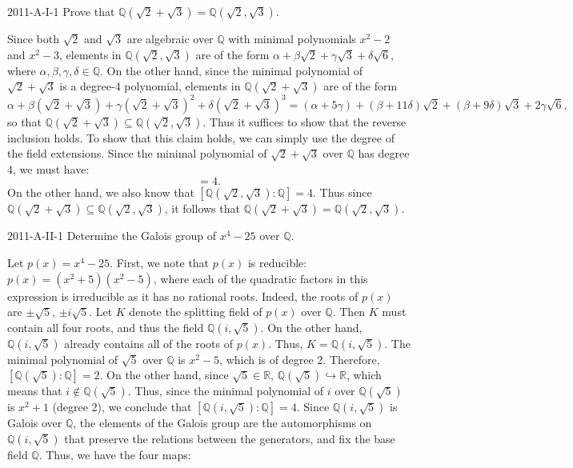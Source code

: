 \documentclass{article}
\newcommand{\embedd}{\hookrightarrow}
\begin{document}
	\begin{prb}{2011-A-I-1}
		Prove that $\mathbb{Q}(\sqrt{2} + \sqrt{3}) = \mathbb{Q}(\sqrt{2}, \sqrt{3})$. 
	\end{prb}
	Since both $\sqrt{2}$ and $\sqrt{3}$ are algebraic over $\mathbb{Q}$ with minimal polynomials $x^{2} - 2$ and $x^{2} - 3$, elements in $\mathbb{Q}(\sqrt{2}, \sqrt{3})$ are of the form $\alpha + \beta \sqrt{2} + \gamma \sqrt{3} + \delta \sqrt{6}$, where $\alpha, \beta, \gamma, \delta \in \mathbb{Q}$. On the other hand, since the minimal polynomial of $\sqrt{2} + \sqrt{3}$ is a degree-4 polynomial, elements in $\mathbb{Q}(\sqrt{2} + \sqrt{3})$ are of the form $$\alpha + \beta (\sqrt{2} + \sqrt{3}) + \gamma (\sqrt{2} + \sqrt{3})^{2} + \delta (\sqrt{2} + \sqrt{3})^{3} = (\alpha + 5\gamma) + (\beta + 11\delta)\sqrt{2} + (\beta + 9\delta)\sqrt{3} + 2\gamma\sqrt{6},$$ 
	so that $\mathbb{Q}(\sqrt{2} + \sqrt{3}) \subseteq \mathbb{Q}(\sqrt{2}, \sqrt{3})$. Thus it suffices to show that the reverse inclusion holds. To show that this claim holds, we can simply use the degree of the field extensions. Since the minimal polynomial of $\sqrt{2} + \sqrt{3}$ over $\mathbb{Q}$ has degree 4, we must have: 
	\begin{equation*}
		[\mathbb{Q}(\sqrt{2} + \sqrt{3}): \mathbb{Q}] = 4. 
	\end{equation*}
	On the other hand, we also know that $[\mathbb{Q}(\sqrt{2}, \sqrt{3}):\mathbb{Q}] = 4$. Thus since $\mathbb{Q}(\sqrt{2} + \sqrt{3}) \subseteq \mathbb{Q}(\sqrt{2}, \sqrt{3})$, it follows that $\mathbb{Q}(\sqrt{2} + \sqrt{3}) = \mathbb{Q}(\sqrt{2}, \sqrt{3})$. 
	\begin{prb}{2011-A-II-1}
		Determine the Galois group of $x^{4} - 25$ over $\mathbb{Q}$. 
	\end{prb}
	Let $p(x) = x^{4} - 25$. First, we note that $p(x)$ is reducible: $p(x) = (x^{2} + 5)(x^{2} - 5)$, where each of the quadratic factors in this expression is irreducible as it has no rational roots. Indeed, the roots of $p(x)$ are $\pm \sqrt{5}$, $\pm i\sqrt{5}$. Let $K$ denote the splitting field of $p(x)$ over $\mathbb{Q}$. Then $K$ must contain all four roots, and thus the field $\mathbb{Q}(i, \sqrt{5})$. On the other hand, $\mathbb{Q}(i, \sqrt{5})$ already contains all of the roots of $p(x)$. Thus, $K = \mathbb{Q}(i,\sqrt{5})$. The minimal polynomial of $\sqrt{5}$ over $\mathbb{Q}$ is $x^{2} - 5$, which is of degree 2. Therefore, $[\mathbb{Q}(\sqrt{5}):\mathbb{Q}] = 2$. On the other hand, since $\sqrt{5} \in \mathbb{R}$, $\mathbb{Q}(\sqrt{5}) \embedd \mathbb{R}$, which means that $i\notin \mathbb{Q}(\sqrt{5})$. Thus, since the minimal polynomial of $i$ over $\mathbb{Q}(\sqrt{5})$ is $x^{2} + 1$ (degree 2), we conclude that $[\mathbb{Q}(i,\sqrt{5}):\mathbb{Q}] = 4$. Since $\mathbb{Q}(i,\sqrt{5})$ is Galois over $\mathbb{Q}$, the elements of the Galois group are the automorphisms on $\mathbb{Q}(i,\sqrt{5})$ that preserve the relations between the generators, and fix the base field $\mathbb{Q}$. Thus, we have the four maps: 
\end{document}
